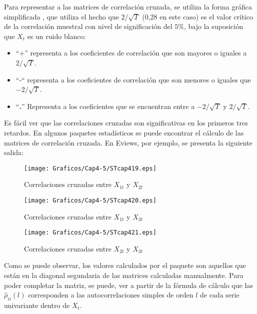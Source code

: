 Para representar a las matrices de correlaci\'{o}n cruzada, se utiliza la forma gr\'{a}fica simplificada %
, que utiliza el hecho que $2/\sqrt{T}$ (0,28 en este caso) es el valor cr\'{i}tico de la correlaci\'{o}n muestral con nivel de significaci\'{o}n del $5\%$, bajo la suposici\'{o}n que $X_{t}$ es un ruido blanco:

\begin{itemize}
\item ``$+$'' representa a los coeficientes de correlaci\'{o}n que son mayores o iguales a $2/\sqrt T $.
\item ``-`` representa a los coeficientes de correlaci\'{o}n que son menores o iguales que $-2/\sqrt T $.
\item ``\textbf{.}'' Representa a los coeficientes que se encuentran entre a $-2/\sqrt T $ y $2/\sqrt T $.
\end{itemize}

Es f\'{a}cil ver que las correlaciones cruzadas son significativas en los primeros tres retardos. En algunos paquetes estad\'{i}sticos se puede encontrar el c\'{a}lculo de las matrices de correlaci\'{o}n cruzada. En Eviews, por ejemplo, se presenta la siguiente salida:

\begin{figure}[H]
\centering
\texttt{[image: Graficos/Cap4-5/STcap419.eps]}
\caption{Correlaciones cruzadas entre $X_{1t}$ y $X_{2t}$}
\label{fig19}
\end{figure}

\begin{figure}[H]
\centering
\texttt{[image: Graficos/Cap4-5/STcap420.eps]}
\caption{Correlaciones cruzadas entre $X_{1t}$ y $X_{3t}$}
\label{fig20}
\end{figure}

\begin{figure}[H]
\centering
\texttt{[image: Graficos/Cap4-5/STcap421.eps]}
\caption{Correlaciones cruzadas entre $X_{2t}$ y $X_{3t}$}
\label{fig21}
\end{figure}


Como se puede observar, los valores calculados por el paquete son aquellos que est\'{a}n en la diagonal segundaria de las matrices calculadas manualmente. Para poder completar la matriz, se puede, ver a partir de la f\'{o}rmula de c\'{a}lculo que las $\hat{\rho }_{ii}\left( l \right)$ corresponden a las autocorrelaciones simples de orden $l$ de cada serie univariante dentro de $X_{t}$.


